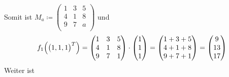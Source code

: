 \documentclass{scrreprt}
\begin{document}
\begin{enumerate}[(a)]
  Somit ist $M_a \coloneqq \begin{pmatrix}
    1 & 3 & 5 \\
    4 & 1 & 8 \\
    9 & 7 & a \\
  \end{pmatrix}$ und
  \[
    f_1 \qty(\qty\big(1, 1, 1)^T) = \begin{pmatrix}
      1 & 3 & 5 \\
      4 & 1 & 8 \\
      9 & 7 & 1 \\
    \end{pmatrix} \cdot \begin{pmatrix}
      1 \\
      1 \\
      1 \\
    \end{pmatrix} = \begin{pmatrix}
      1 + 3 + 5 \\
      4 + 1 + 8 \\
      9 + 7 + 1 \\
    \end{pmatrix} = \begin{pmatrix}
      9 \\
      13 \\
      17 \\
    \end{pmatrix}
  \]
  Weiter ist
\end{enumerate}
\end{document}

